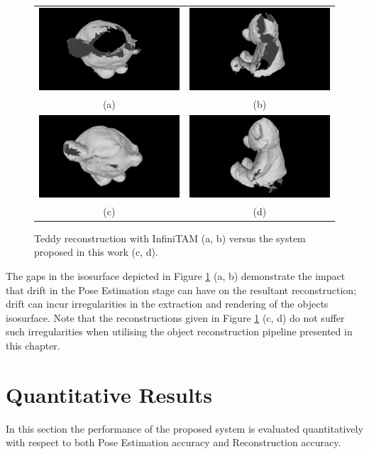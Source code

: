 \begin{figure}[ht]
  \label{fig:probobj_gappy_teddy}
	\centering
	\begin{tabular}{cc}
		\includegraphics[width=.2\linewidth]{figures/object_recon/gappy/one_scene00.png}&
    \includegraphics[width=.2\linewidth]{figures/object_recon/gappy/one_scene01.png}\\
    (a) & (b) \\
		\includegraphics[width=.2\linewidth]{figures/object_recon/gappy/multi_scene00.png}&
    \includegraphics[width=.2\linewidth]{figures/object_recon/gappy/multi_scene01.png}\\
    (c) & (d)\\
	\end{tabular}
  \caption[Probabilistic Object Reconstruction Qualitative Results V]
  {
    Teddy reconstruction with InfiniTAM (a, b) versus the system proposed in this 
    work (c, d).
	}
\end{figure}

The gaps in the isosurface depicted in Figure \ref{fig:probobj_gappy_teddy} (a, b) 
demonstrate the impact that drift in the Pose Estimation stage can have on the resultant 
reconstruction; drift can incur irregularities in the extraction and rendering of the objects 
isosurface. Note that the reconstructions given in Figure \ref{fig:probobj_gappy_teddy} 
(c, d) do not suffer such irregularities when utilising the object reconstruction pipeline 
presented in this chapter.

\section{Quantitative Results}
In this section the performance of the proposed system is evaluated quantitatively with respect 
to both Pose Estimation accuracy and Reconstruction accuracy. 

